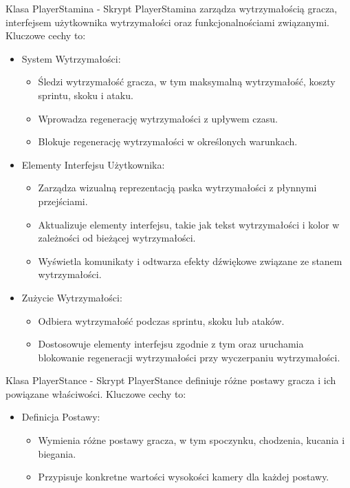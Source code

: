Klasa PlayerStamina -
Skrypt PlayerStamina zarządza wytrzymałością gracza, interfejsem użytkownika wytrzymałości oraz funkcjonalnościami związanymi. Kluczowe cechy to:
\begin{itemize}
  \item System Wytrzymałości:
    \begin{itemize}
      \item Śledzi wytrzymałość gracza, w tym maksymalną wytrzymałość, koszty sprintu, skoku i ataku.
      \item Wprowadza regenerację wytrzymałości z upływem czasu.
      \item Blokuje regenerację wytrzymałości w określonych warunkach.
    \end{itemize}
  \item Elementy Interfejsu Użytkownika:
    \begin{itemize}
      \item Zarządza wizualną reprezentacją paska wytrzymałości z płynnymi przejściami.
      \item Aktualizuje elementy interfejsu, takie jak tekst wytrzymałości i kolor w zależności od bieżącej wytrzymałości.
      \item Wyświetla komunikaty i odtwarza efekty dźwiękowe związane ze stanem wytrzymałości.
    \end{itemize}
  \item Zużycie Wytrzymałości:
    \begin{itemize}
      \item Odbiera wytrzymałość podczas sprintu, skoku lub ataków.
      \item Dostosowuje elementy interfejsu zgodnie z tym oraz uruchamia blokowanie regeneracji wytrzymałości przy wyczerpaniu wytrzymałości.
    \end{itemize}
\end{itemize}

Klasa PlayerStance -
Skrypt PlayerStance definiuje różne postawy gracza i ich powiązane właściwości. Kluczowe cechy to:
\begin{itemize}
  \item Definicja Postawy:
    \begin{itemize}
      \item Wymienia różne postawy gracza, w tym spoczynku, chodzenia, kucania i biegania.
      \item Przypisuje konkretne wartości wysokości kamery dla każdej postawy.
    \end{itemize}
\end{itemize}

